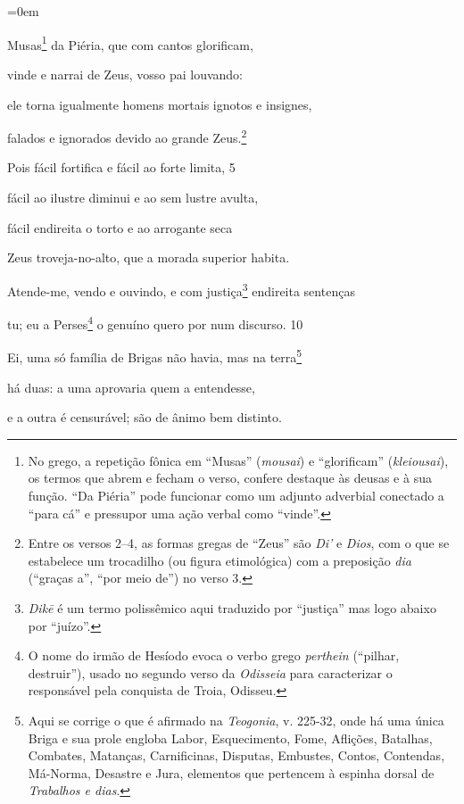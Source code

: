 \chapter*{}

\begingroup\parindent=0em

Musas\footnote{No grego, a repetição fônica em ``Musas'' (\emph{m\emph{ousai}}) e
``glorificam'' (\emph{klei\emph{ousai}}), os termos que abrem e fecham o
verso, confere destaque às deusas e à sua função. ``Da Piéria'' pode
funcionar como um adjunto adverbial conectado a ``para cá'' e pressupor
uma ação verbal como ``vinde''.} da Piéria, que com cantos glorificam,

vinde e narrai de Zeus, vosso pai louvando:

ele torna igualmente homens mortais ignotos e insignes,

falados e ignorados devido ao grande Zeus.\footnote{Entre os versos 2--4, as formas gregas de ``Zeus'' são \emph{Di'} e
\emph{Dios}, com o que se estabelece um trocadilho (ou figura
etimológica) com a preposição \emph{dia} (``graças a'', ``por meio de'')
no verso 3.}

Pois fácil fortifica e fácil ao forte limita, \num{5}

fácil ao ilustre diminui e ao sem lustre avulta,

fácil endireita o torto e ao arrogante seca

Zeus troveja-no-alto, que a morada superior habita.

Atende-me, vendo e ouvindo, e com justiça\footnote{\emph{Dikē} é um termo polissêmico aqui traduzido por ``justiça'' mas
logo abaixo por ``juízo''.} endireita sentenças

tu; eu a Perses\footnote{O nome do irmão de Hesíodo evoca o verbo grego \emph{perthein}
(``pilhar, destruir''), usado no segundo verso da \emph{Odisseia} para
caracterizar o responsável pela conquista de Troia, Odisseu.} o genuíno quero por num discurso. \num{10}

Ei, uma só família de Brigas não havia, mas na terra\footnote{Aqui se corrige o que é afirmado na \emph{Teogonia}, v. 225-32, onde
há uma única Briga e sua prole engloba Labor, Esquecimento, Fome,
Aflições, Batalhas, Combates, Matanças, Carnificinas, Disputas,
Embustes, Contos, Contendas, Má-Norma, Desastre e Jura, elementos que
pertencem à espinha dorsal de \emph{Trabalhos e dias}.}

há duas: a uma aprovaria quem a entendesse,

e a outra é censurável; são de ânimo bem distinto.

